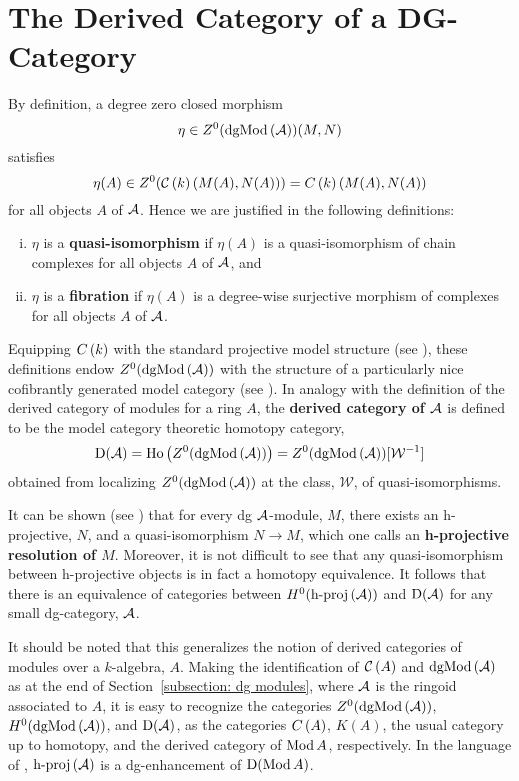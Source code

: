  \section{The Derived Category of a DG-Category}
By definition, a degree zero closed morphism
\[\eta \in Z^0(\operatorname{dgMod}\left(\mathcal{A}\right))(M,N)\]
satisfies
\[\eta(A) \in Z^0(\mathcal{C}\left(k\right)(M(A), N(A))) = C\left(k\right)(M(A), N(A))\]
for all objects \(A\) of \(\mathcal{A}\).
Hence we are justified in the following definitions:
\begin{enumerate}[(i)]
\item
  \(\eta\) is a \textbf{quasi-isomorphism} if \(\eta(A)\) is a quasi-isomorphism of chain complexes for all objects \(A\) of \(\mathcal{A}\), and
\item
  \(\eta\) is a \textbf{fibration} if \(\eta(A)\) is a degree-wise surjective morphism of complexes for all objects \(A\) of \(\mathcal{A}\).
\end{enumerate}
Equipping \(C\left(k\right)\) with the standard projective model structure (see \parencite[Section 2.3]{Hovey99}), these definitions endow \(Z^0(\operatorname{dgMod}\left(\mathcal{A}\right))\) with the structure of a particularly nice cofibrantly generated model category (see \parencite[Section 3]{Toen07}).
In analogy with the definition of the derived category of modules for a ring \(A\), the \textbf{derived category of \(\mathcal{A}\)} is defined to be the model category theoretic homotopy category,
\[\mathrm{D}(\mathcal{A}) = \operatorname{Ho}\left(Z^0(\operatorname{dgMod}\left(\mathcal{A}\right))\right) = Z^0(\operatorname{dgMod}\left(\mathcal{A}\right))[\mathcal{W}^{-1}]\]
obtained from localizing \(Z^0(\operatorname{dgMod}\left(\mathcal{A}\right))\) at the class, \(\mathcal{W}\), of quasi-isomorphisms.

It can be shown (see \parencite[Section 3.5]{Keller95}) that for every dg \(\mathcal{A}\)-module, \(M\), there exists an h-projective, \(N\), and a quasi-isomorphism \(N \to M\), which one calls an \textbf{h-projective resolution of \(M\)}.
Moreover, it is not difficult to see that any quasi-isomorphism between h-projective objects is in fact a homotopy equivalence.
It follows that there is an equivalence of categories between \(H^0(\operatorname{h-proj}\left(\mathcal{A}\right))\) and \(\mathrm{D}(\mathcal{A})\) for any small dg-category, \(\mathcal{A}\).

It should be noted that this generalizes the notion of derived categories of modules over a $k$-algebra, $A$.
Making the identification of $\mathcal{C}\left(A\right)$ and $\operatorname{dgMod}\left(\mathcal{A}\right)$ as at the end of Section~\ref{subsection: dg modules}, where $\mathcal{A}$ is the ringoid associated to $A$, it is easy to recognize the categories \(Z^0(\operatorname{dgMod}\left(\mathcal{A}\right))\), \(H^0(\operatorname{dgMod}\left(\mathcal{A}\right))\), and \(\mathrm{D}(\mathcal{A})\), as the categories \(C\left(A\right)\), \(K(A)\), the usual category up to homotopy, and the derived category of \(\operatorname{Mod}A\), respectively.
In the language of \parencite{Lunts-Orlov}, \(\operatorname{h-proj}\left(\mathcal{A}\right)\) is a dg-enhancement of \(\mathrm{D}(\operatorname{Mod}A)\).


